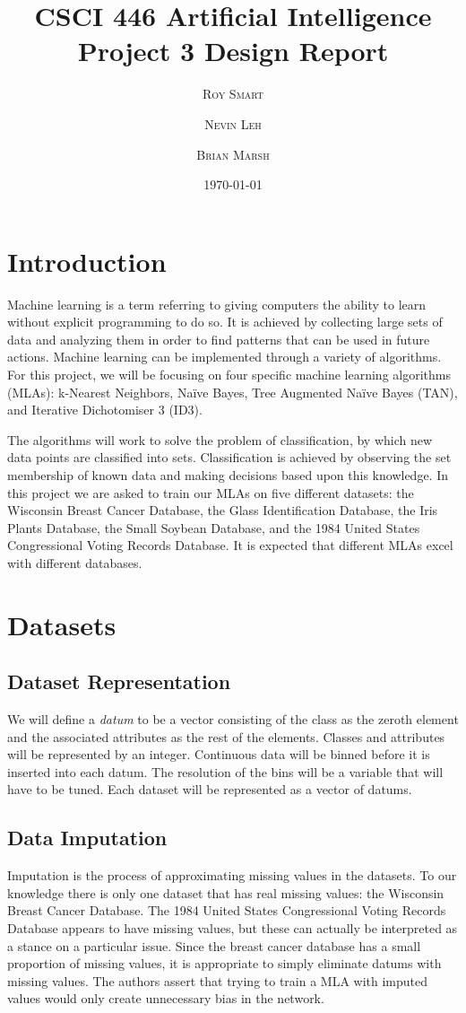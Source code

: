 \documentclass{article}
\title{\vspace{-15mm}\fontsize{24pt}{10pt}\selectfont\textbf{CSCI 446 Artificial Intelligence \\[2mm] Project 3 Design Report} } %
\date{\today}
\author{
\large
\textsc{Roy Smart} \and \textsc{Nevin Leh} \and \textsc{Brian Marsh}\\[2mm] %
}
\begin{document}
	\maketitle %
	\thispagestyle{fancy} %
	\normalsize

	\section{Introduction}
		Machine learning is a term referring to giving computers the ability to learn without explicit programming to do so.  
		It is achieved by collecting large sets of data and analyzing them in order to find patterns that can be used in future actions.  
		Machine learning can be implemented through a variety of algorithms.  
		For this project, we will be focusing on four specific machine learning algorithms (MLAs): k-Nearest Neighbors, Naïve Bayes, Tree Augmented Naïve Bayes (TAN), and Iterative Dichotomiser 3 (ID3). 
		
		The algorithms will work to solve the problem of classification, by which new data points are classified into sets.
		Classification is achieved by observing the set membership of known data and making decisions based upon this knowledge.
		In this project we are asked to train our MLAs on five different datasets: the Wisconsin Breast Cancer Database, the Glass Identification Database, the Iris Plants Database, the Small Soybean Database, and the 1984 United States Congressional Voting Records Database. It is expected that different MLAs excel with different databases.
	\section{Datasets}
		\subsection{Dataset Representation}
			We will define a \textit{datum} to be a vector consisting of the class as the zeroth element and the associated attributes as the rest of the elements. Classes and attributes will be represented by an integer. Continuous data will be binned before it is inserted into each datum. The resolution of the bins will be a variable that will have to be tuned. Each dataset will be represented as a vector of datums.
		\subsection{Data Imputation}
			Imputation is the process of approximating missing values in the datasets. 
			To our knowledge there is only one dataset that has real missing values: the Wisconsin Breast Cancer Database. 
			The 1984 United States Congressional Voting Records Database appears to have missing values, but these can actually be interpreted as a stance on a particular issue. 
			Since the breast cancer database has a small proportion of missing values, it is appropriate to simply eliminate datums with missing values. 
			The authors assert that trying to train a MLA with imputed values would only create unnecessary bias in the network.
			
\end{document}
